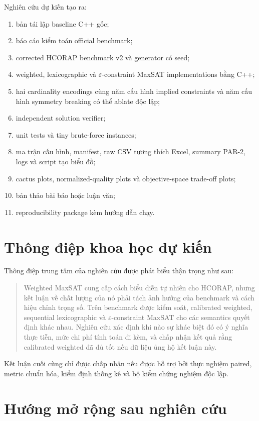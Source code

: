 \documentclass[12pt,a4paper]{article}
\begin{document}
Nghiên cứu dự kiến tạo ra:
\begin{enumerate}
  \item bản tái lập baseline C++ gốc;
  \item báo cáo kiểm toán official benchmark;
  \item corrected HCORAP benchmark v2 và generator có seed;
  \item weighted, lexicographic và $\varepsilon$-constraint MaxSAT
        implementations bằng C++;
  \item hai cardinality encodings cùng năm cấu hình implied constraints và năm
        cấu hình symmetry breaking có thể ablate độc lập;
  \item independent solution verifier;
  \item unit tests và tiny brute-force instances;
  \item ma trận cấu hình, manifest, raw CSV tương thích Excel, summary PAR-2,
        logs và script tạo biểu đồ;
  \item cactus plots, normalized-quality plots và objective-space trade-off plots;
  \item bản thảo bài báo hoặc luận văn;
  \item reproducibility package kèm hướng dẫn chạy.
\end{enumerate}

\section{Thông điệp khoa học dự kiến}

Thông điệp trung tâm của nghiên cứu được phát biểu thận trọng như sau:

\begin{quote}
Weighted MaxSAT cung cấp cách biểu diễn tự nhiên cho HCORAP, nhưng kết luận về
chất lượng của nó phải tách ảnh hưởng của benchmark và cách hiệu chỉnh trọng số.
Trên benchmark được kiểm soát, calibrated weighted, sequential lexicographic và
$\varepsilon$-constraint MaxSAT cho các semantics quyết định khác nhau. Nghiên
cứu xác định khi nào sự khác biệt đó có ý nghĩa thực tiễn, mức chi phí tính toán
đi kèm, và chấp nhận kết quả rằng calibrated weighted đã đủ tốt nếu dữ liệu ủng
hộ kết luận này.
\end{quote}

Kết luận cuối cùng chỉ được chấp nhận nếu được hỗ trợ bởi thực nghiệm paired,
metric chuẩn hóa, kiểm định thống kê và bộ kiểm chứng nghiệm độc lập.

\section{Hướng mở rộng sau nghiên cứu}
\end{document}
